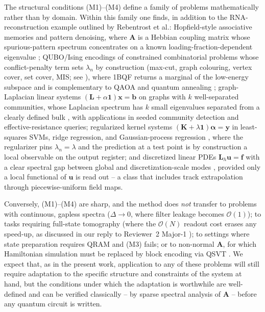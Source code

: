 \documentclass[11pt,a4paper]{article}
\newcommand{\OBQF}{\textsc{1BQF}}
\begin{document}
The structural conditions (M1)--(M4) define a family of problems
mathematically rather than by domain. Within this family one finds, in
addition to the RNA-reconstruction example outlined by Rebentrost et
al.: Hopfield-style associative memories and pattern denoising, where
$\mathbf{A}$ is a Hebbian coupling matrix whose spurious-pattern
spectrum concentrates on a known loading-fraction-dependent eigenvalue
\cite{Hopfield:1982,Amit:1985}; QUBO/Ising encodings of constrained
combinatorial problems whose conflict-penalty term sets $\lambda_n$ by
construction (max-cut, graph colouring, vertex cover, set cover, MIS;
see \cite{Lucas:2014}), where \OBQF{} returns a marginal of the
low-energy subspace and is complementary to QAOA \cite{Farhi:2014} and
quantum annealing \cite{Kadowaki:1998}; graph-Laplacian linear systems
$(\mathbf{L}+\alpha\mathbf{1})\mathbf{x}=\mathbf{b}$ on graphs with
$k$ well-separated communities, whose Laplacian spectrum has $k$ small
eigenvalues separated from a clearly defined bulk
\cite{vonLuxburg:2007,Apers:2022,Childs:2017}, with applications in
seeded community detection and effective-resistance queries; regularized
kernel systems $(\mathbf{K}+\lambda\mathbf{1})\boldsymbol{\alpha}
= \mathbf{y}$ in least-squares SVMs, ridge regression, and
Gaussian-process regression \cite{Williams:2006,Rebentrost:2014:qsvm},
where the regularizer pins $\lambda_n=\lambda$ and the prediction at a
test point is by construction a local observable on the output
register; and discretized linear PDEs
$\mathbf{L}_h\mathbf{u}=\mathbf{f}$ with a clear spectral gap between
global and discretization-scale modes \cite{Berry:2014:qode,Berry:2017},
provided only a local functional of $\mathbf{u}$ is read out -- a class
that includes track extrapolation through piecewise-uniform field maps.

Conversely, (M1)--(M4) are sharp, and the method does \emph{not}
transfer to problems with continuous, gapless spectra
($\Delta \to 0$, where filter leakage becomes $\mathcal{O}(1)$); to
tasks requiring full-state tomography (where the
$\mathcal{O}(N)$ readout cost erases any speed-up, as discussed in our
reply to Reviewer~2 Major-1
\cite{Aaronson:2015:readingthefineprint,Tang:2019}); to settings
where state preparation requires QRAM and (M3) fails; or to
non-normal $\mathbf{A}$, for which Hamiltonian simulation must be
replaced by block encoding via QSVT \cite{Gilyen:2019,Martyn:2021}.
We expect that, as in the present work, application to any of these
problems will still require adaptation to the specific structure and
constraints of the system at hand, but the conditions under which the
adaptation is worthwhile are well-defined and can be verified
classically -- by sparse spectral analysis of $\mathbf{A}$ -- before
any quantum circuit is written.



\end{document}
